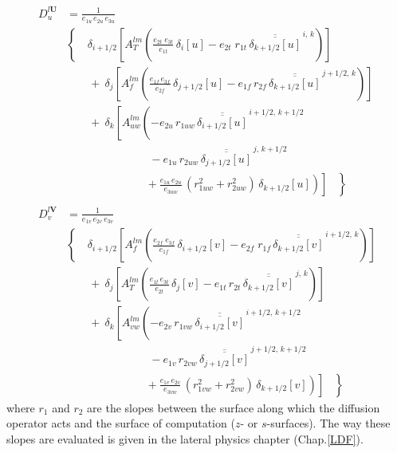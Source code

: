 \begin{equation} \label{Eq_dyn_ldf_iso}
\begin{split}
 D_u^{l\textbf{U}} &= \frac{1}{e_{1u} \, e_{2u} \, e_{3u} }	\\
&  \left\{\quad  {\delta _{i+1/2} \left[ {A_T^{lm}  \left( 
	 {\frac{e_{2t} \; e_{3t} }{e_{1t} } \,\delta _{i}[u]
	-e_{2t} \; r_{1t} \,\overline{\overline {\delta _{k+1/2}[u]}}^{\,i,\,k}}
 \right)} \right]} 	\right.
\\ 
& \qquad +\ \delta_j \left[ {A_f^{lm} \left( {\frac{e_{1f}\,e_{3f} }{e_{2f} 
}\,\delta _{j+1/2} [u] - e_{1f}\, r_{2f} 
\,\overline{\overline {\delta _{k+1/2} [u]}} ^{\,j+1/2,\,k}} 
\right)} \right] 
\\ 
&\qquad +\ \delta_k \left[ {A_{uw}^{lm} \left( {-e_{2u} \, r_{1uw} \,\overline{\overline 
{\delta_{i+1/2} [u]}}^{\,i+1/2,\,k+1/2} } 
\right.} \right. 
\\ 
&  \ \qquad \qquad \qquad \quad\ 
- e_{1u} \, r_{2uw} \,\overline{\overline {\delta_{j+1/2} [u]}} ^{\,j,\,k+1/2}
\\ 
& \left. {\left. { \ \qquad \qquad \qquad \ \ \ \left. {\ 
+\frac{e_{1u}\, e_{2u} }{e_{3uw} }\,\left( {r_{1uw}^2+r_{2uw}^2} 
\right)\,\delta_{k+1/2} [u]} \right)} \right]\;\;\;} \right\} 
\\
\\
 D_v^{l\textbf{V}} &= \frac{1}{e_{1v} \, e_{2v} \, e_{3v} }    \\
&  \left\{\quad  {\delta _{i+1/2} \left[ {A_f^{lm}  \left( 
	 {\frac{e_{2f} \; e_{3f} }{e_{1f} } \,\delta _{i+1/2}[v]
	-e_{2f} \; r_{1f} \,\overline{\overline {\delta _{k+1/2}[v]}}^{\,i+1/2,\,k}}
 \right)} \right]} 	\right.
\\ 
& \qquad +\ \delta_j \left[ {A_T^{lm} \left( {\frac{e_{1t}\,e_{3t} }{e_{2t} 
}\,\delta _{j} [v] - e_{1t}\, r_{2t} 
\,\overline{\overline {\delta _{k+1/2} [v]}} ^{\,j,\,k}} 
\right)} \right] 
\\ 
& \qquad +\ \delta_k \left[ {A_{vw}^{lm} \left( {-e_{2v} \, r_{1vw} \,\overline{\overline 
{\delta_{i+1/2} [v]}}^{\,i+1/2,\,k+1/2} }\right.} \right. 
\\
&  \ \qquad \qquad \qquad \quad\ 
- e_{1v} \, r_{2vw} \,\overline{\overline {\delta_{j+1/2} [v]}} ^{\,j+1/2,\,k+1/2}
\\ 
& \left. {\left. { \ \qquad \qquad \qquad \ \ \ \left. {\ 
+\frac{e_{1v}\, e_{2v} }{e_{3vw} }\,\left( {r_{1vw}^2+r_{2vw}^2} 
\right)\,\delta_{k+1/2} [v]} \right)} \right]\;\;\;} \right\} 
 \end{split}
\end{equation}
where $r_1$ and $r_2$ are the slopes between the surface along which the 
diffusion operator acts and the surface of computation ($z$- or $s$-surfaces). 
The way these slopes are evaluated is given in the lateral physics chapter 
(Chap.\ref{LDF}).


